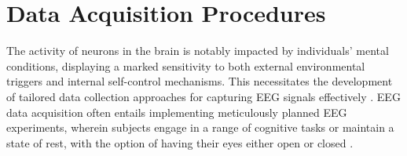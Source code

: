 


\section{Data Acquisition Procedures}
\label{sec:Background:Data Acquisition Procedures}
The activity of neurons in the brain is notably impacted by individuals' mental conditions, displaying a marked sensitivity to both external environmental triggers and internal self-control mechanisms. This necessitates the development of tailored data collection approaches for capturing EEG signals effectively \cite{zhang2021review}. 
EEG data acquisition often entails implementing meticulously planned EEG experiments, wherein subjects engage in a range of cognitive tasks or maintain a state of rest, with the option of having their eyes either open or closed \cite{survey_brain_biometrics}. 
\smallskip

